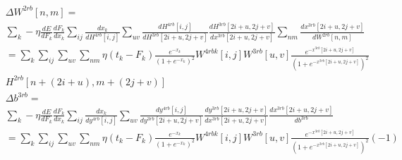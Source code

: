 \documentclass[a4paper,onecolumn]{report}
\begin{document}
\begin{small}
\begin{equation}
\begin{split}
	&\Delta W^{2rb}[n,m] = \\
	&\sum_{k} - \eta  \frac{dE}{dF_{k}} 
	\frac{dF_{k}}{dx_{k}} 
	\sum_{ij} \frac{dx_{k}}{dH^{4rb}[i,j]} 
	\sum_{uv}\frac{dH^{4rb}[i,j]}{d H^{3rb} [2i+u,2j+v]} 
	\frac{d H^{3rb} [2i+u,2j+v]}{d x^{3rb}[2i+u,2j+v]}
	\sum_{nm}\frac{d x^{3rb}[2i+u,2j+v]}{d W^{2rb}[n,m]} \\
	&=\sum_{k} \sum_{ij} \sum_{uv} \sum_{nm}  \eta (t_{k}-F_{k})\frac{e^{-x_{k}}}{(1+e^{-x_{k}})^{2}} W^{4rbk}[i,j]  W^{3rb}[u,v] \frac{e^{-x^{3rb}[2i+u,2j+v]}}{(1+e^{-x^{3rb}[2i+u,2j+v]})^2} \\
	 &H^{2rb} [n+(2i+u),m+(2j+v)]
\end{split}
\end{equation}
\begin{equation}
\begin{split}
	&\Delta b^{3rb} =\\
	&\sum_{k} - \eta  \frac{dE}{dF_{k}} 
	\frac{dF_{k}}{dx_{k}} 
	\sum_{ij} \frac{dx_{k}}{dy^{4rb}[i,j]} 
	\sum_{uv}\frac{dy^{4rb}[i,j]}{d y^{3rb} [2i+u,2j+v]} 
	\frac{d y^{3rb} [2i+u,2j+v]}{d x^{3rb}[2i+u,2j+v]}
	\frac{d x^{3rb}[2i+u,2j+v]}{d b^{3rb}} \\
	&=\sum_{k} \sum_{ij} \sum_{uv} \sum_{nm}  \eta (t_{k}-F_{k})\frac{e^{-x_{k}}}{(1+e^{-x_{k}})^{2}} W^{4rbk}[i,j]  W^{3rb}[u,v] \frac{e^{-x^{3rb}[2i+u,2j+v]}}{(1+e^{-x^{3rb}[2i+u,2j+v]})^2} (-1)
\end{split}
\end{equation}
\end{small}
\begin{small}
\begin{equation}
\end{equation}
\end{small}
\end{document}
